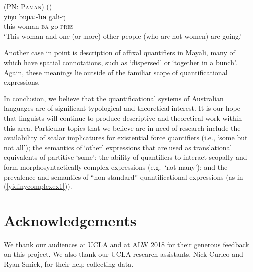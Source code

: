 \documentclass[12pt,egregdoesnotlikesansseriftitles]{scrartcl}
\begin{document}
\begin{exe}
  \ex \textsc{ (PN: Paman)} \hfill (\citealt[146]{dixon77}) \label{yidinycomplexex1}\\
  \gll yiŋu buɲaː-\textbf{ba}  gali-ŋ\\
  this woman-\textsc{ba}  go-\textsc{pres} \\
  \glt `This woman and one (or more) other people (who are not women) are going.'
\end{exe}

Another case in point is  description of affixal quantifiers in Mayali, many of which have spatial connotations, such as `dispersed' or `together in a bunch'. Again, these meanings lie outside of the familiar scope of quantificational expressions.

In conclusion, we believe that the quantificational systems of Australian languages are of significant typological and theoretical interest. It is our hope that linguists will continue to produce descriptive and theoretical work within this area. Particular topics that we believe are in need of research include the availability of scalar implicatures for existential force quantifiers (i.e., `some but not all'); the semantics of `other' expressions that are used as translational equivalents of partitive `some'; the ability of quantifiers to interact scopally and form morphosyntactically complex expressions (e.g.\ `not many'); and the prevalence and semantics of ``non-standard'' quantificational expressions (as in (\ref{yidinycomplexex1})). 

\section*{Acknowledgements}

We thank our audiences at UCLA and at ALW 2018 for their generous feedback on this project. We also thank our UCLA research assistants, Nick Curleo and Ryan Smick, for their help collecting data. %


\printbibliography
\end{document}
